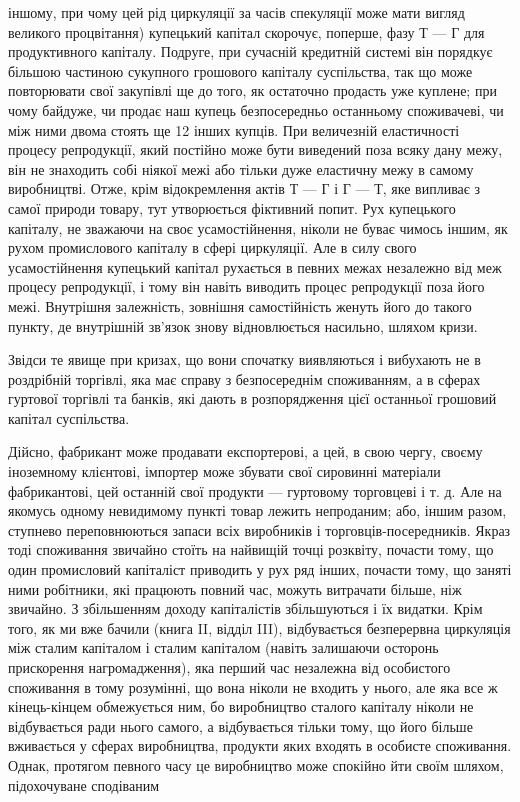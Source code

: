 \parcont{}  %
іншому, при чому цей рід циркуляції за часів спекуляції може
мати вигляд великого процвітання) купецький капітал скорочує,
поперше, фазу Т — Г для продуктивного капіталу. Подруге, при
сучасній кредитній системі він порядкує більшою частиною
сукупного грошового капіталу суспільства, так що може повторювати
свої закупівлі ще до того, як остаточно продасть уже
куплене; при чому байдуже, чи продає наш купець безпосередньо
останньому споживачеві, чи між ними двома стоять ще
12 інших купців. При величезній еластичності процесу репродукції,
який постійно може бути виведений поза всяку дану
межу, він не знаходить собі ніякої межі або тільки дуже еластичну
межу в самому виробництві. Отже, крім відокремлення актів
Т — Г і Г — Т, яке випливає з самої природи товару, тут утворюється
фіктивний попит. Рух купецького капіталу, не зважаючи
на своє усамостійнення, ніколи не буває чимось іншим, як рухом
промислового капіталу в сфері циркуляції. Але в силу свого
усамостійнення купецький капітал рухається в певних межах незалежно
від меж процесу репродукції, і тому він навіть виводить
процес репродукції поза його межі. Внутрішня залежність, зовнішня
самостійність женуть його до такого пункту, де внутрішній
зв’язок знову відновлюється насильно, шляхом кризи.

Звідси те явище при кризах, що вони спочатку виявляються
і вибухають не в роздрібній торгівлі, яка має справу з безпосереднім
споживанням, а в сферах гуртової торгівлі та банків,
які дають в розпорядження цієї останньої грошовий капітал
суспільства.

Дійсно, фабрикант може продавати експортерові, а цей, в свою
чергу, своєму іноземному клієнтові, імпортер може збувати
свої сировинні матеріали фабрикантові, цей останній свої продукти
— гуртовому торговцеві і т. д. Але на якомусь одному
невидимому пункті товар лежить непроданим; або, іншим разом,
ступнево переповнюються запаси всіх виробників і торговців-посередників.
Якраз тоді споживання звичайно стоїть на найвищій
точці розквіту, почасти тому, що один промисловий капіталіст
приводить у рух ряд інших, почасти тому, що заняті
ними робітники, які працюють повний час, можуть витрачати
більше, ніж звичайно. З збільшенням доходу капіталістів збільшуються
і їх видатки. Крім того, як ми вже бачили (книга II,
відділ III), відбувається безперервна циркуляція між сталим капіталом
і сталим капіталом (навіть залишаючи осторонь прискорення
нагромадження), яка перший час незалежна від особистого
споживання в тому розумінні, що вона ніколи не входить
у нього, але яка все ж кінець-кінцем обмежується ним,
бо виробництво сталого капіталу ніколи не відбувається ради
нього самого, а відбувається тільки тому, що його більше
вживається у сферах виробництва, продукти яких входять в особисте
споживання. Однак, протягом певного часу це виробництво
може спокійно йти своїм шляхом, підохочуване сподіваним
\parbreak{}  %
